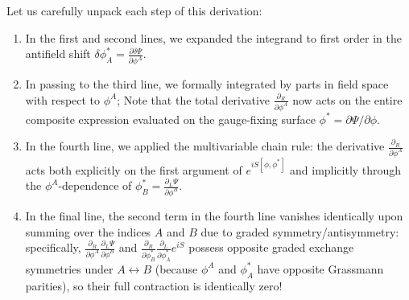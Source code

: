 Let us carefully unpack each step of this derivation:
\begin{enumerate}
    \item In the first and second lines, we expanded the integrand to first order in the antifield shift \(\delta \phi_A^* = \frac{\partial \delta\Psi}{\partial \phi^A}\).
    \item In passing to the third line, we formally integrated by parts in field space with respect to \(\phi^A\); Note that the total derivative \(\frac{\partial_R}{\partial \phi^A}\) now acts on the entire composite expression evaluated on the gauge-fixing surface \(\phi^* = \partial\Psi / \partial\phi\).
    \item In the fourth line, we applied the multivariable chain rule: the derivative \(\frac{\partial_R}{\partial \phi^A}\) acts both explicitly on the first argument of \(e^{iS[\phi, \phi^*]}\) and implicitly through the \(\phi^A\)-dependence of \(\phi_B^* = \frac{\partial_L \Psi}{\partial \phi^B}\).
    \item In the final line, the second term in the fourth line vanishes identically upon summing over the indices \(A\) and \(B\) due to graded symmetry/antisymmetry: specifically, \(\frac{\partial_R}{\partial \phi^A} \frac{\partial_L \Psi}{\partial \phi^B}\) and \(\frac{\partial_R}{\partial \phi_B^*} \frac{\partial_L}{\partial \phi_A^*} e^{iS}\) possess opposite graded exchange symmetries under \(A \leftrightarrow B\) (because \(\phi^A\) and \(\phi_A^*\) have opposite Grassmann parities), so their full contraction is identically zero!
\end{enumerate}

